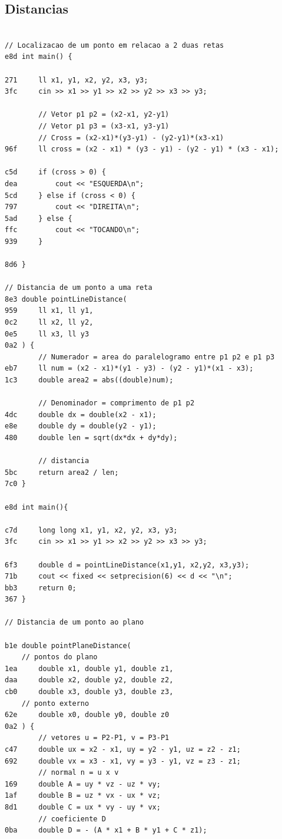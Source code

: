 \documentclass[11pt, a4paper, twoside]{article}
\begin{document}
\subsection{Distancias}
\begin{lstlisting}

// Localizacao de um ponto em relacao a 2 duas retas
e8d int main() {
    
271     ll x1, y1, x2, y2, x3, y3;
3fc     cin >> x1 >> y1 >> x2 >> y2 >> x3 >> y3;
    
        // Vetor p1 p2 = (x2-x1, y2-y1)
        // Vetor p1 p3 = (x3-x1, y3-y1)
        // Cross = (x2-x1)*(y3-y1) - (y2-y1)*(x3-x1)
96f     ll cross = (x2 - x1) * (y3 - y1) - (y2 - y1) * (x3 - x1);
    
c5d     if (cross > 0) {
dea         cout << "ESQUERDA\n";
5cd     } else if (cross < 0) {
797         cout << "DIREITA\n";
5ad     } else {
ffc         cout << "TOCANDO\n";
939     }
    
8d6 }

// Distancia de um ponto a uma reta
8e3 double pointLineDistance(
959     ll x1, ll y1,
0c2     ll x2, ll y2,
0e5     ll x3, ll y3
0a2 ) {
        // Numerador = area do paralelogramo entre p1 p2 e p1 p3
eb7     ll num = (x2 - x1)*(y1 - y3) - (y2 - y1)*(x1 - x3);
1c3     double area2 = abs((double)num);
    
        // Denominador = comprimento de p1 p2
4dc     double dx = double(x2 - x1);
e8e     double dy = double(y2 - y1);
480     double len = sqrt(dx*dx + dy*dy);
    
        // distancia
5bc     return area2 / len;
7c0 }

e8d int main(){
    
c7d     long long x1, y1, x2, y2, x3, y3;
3fc     cin >> x1 >> y1 >> x2 >> y2 >> x3 >> y3;
    
6f3     double d = pointLineDistance(x1,y1, x2,y2, x3,y3);
71b     cout << fixed << setprecision(6) << d << "\n";
bb3     return 0;
367 }

// Distancia de um ponto ao plano

b1e double pointPlaneDistance(
    // pontos do plano
1ea     double x1, double y1, double z1,
daa     double x2, double y2, double z2,
cb0     double x3, double y3, double z3,
    // ponto externo
62e     double x0, double y0, double z0
0a2 ) {
        // vetores u = P2-P1, v = P3-P1
c47     double ux = x2 - x1, uy = y2 - y1, uz = z2 - z1;
692     double vx = x3 - x1, vy = y3 - y1, vz = z3 - z1;
        // normal n = u x v
169     double A = uy * vz - uz * vy;
1af     double B = uz * vx - ux * vz;
8d1     double C = ux * vy - uy * vx;
        // coeficiente D
0ba     double D = - (A * x1 + B * y1 + C * z1);
    

\end{lstlisting}
\end{document}
